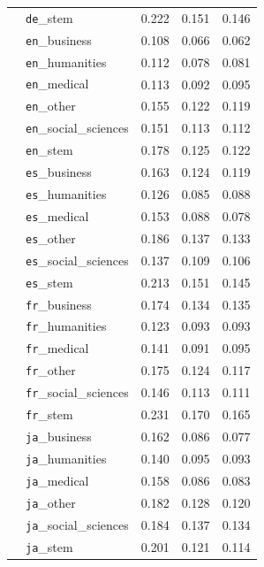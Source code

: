 \documentclass[11pt]{article}
\begin{document}
\begin{table}[t]
\begin{tabular}{llccc}
          & \texttt{de}\_stem            & 0.222 & 0.151 & 0.146 \\
          & \texttt{en}\_business        & 0.108 & 0.066 & 0.062 \\
          & \texttt{en}\_humanities      & 0.112 & 0.078 & 0.081 \\
          & \texttt{en}\_medical         & 0.113 & 0.092 & 0.095 \\
          & \texttt{en}\_other           & 0.155 & 0.122 & 0.119 \\
          & \texttt{en}\_social\_sciences & 0.151 & 0.113 & 0.112 \\
          & \texttt{en}\_stem            & 0.178 & 0.125 & 0.122 \\
          & \texttt{es}\_business        & 0.163 & 0.124 & 0.119 \\
          & \texttt{es}\_humanities      & 0.126 & 0.085 & 0.088 \\
          & \texttt{es}\_medical         & 0.153 & 0.088 & 0.078 \\
          & \texttt{es}\_other           & 0.186 & 0.137 & 0.133 \\
          & \texttt{es}\_social\_sciences & 0.137 & 0.109 & 0.106 \\
          & \texttt{es}\_stem            & 0.213 & 0.151 & 0.145 \\
          & \texttt{fr}\_business        & 0.174 & 0.134 & 0.135 \\
          & \texttt{fr}\_humanities      & 0.123 & 0.093 & 0.093 \\
          & \texttt{fr}\_medical         & 0.141 & 0.091 & 0.095 \\
          & \texttt{fr}\_other           & 0.175 & 0.124 & 0.117 \\
          & \texttt{fr}\_social\_sciences & 0.146 & 0.113 & 0.111 \\
          & \texttt{fr}\_stem            & 0.231 & 0.170 & 0.165 \\
          & \texttt{ja}\_business        & 0.162 & 0.086 & 0.077 \\
          & \texttt{ja}\_humanities      & 0.140 & 0.095 & 0.093 \\
          & \texttt{ja}\_medical         & 0.158 & 0.086 & 0.083 \\
          & \texttt{ja}\_other           & 0.182 & 0.128 & 0.120 \\
          & \texttt{ja}\_social\_sciences & 0.184 & 0.137 & 0.134 \\
          & \texttt{ja}\_stem            & 0.201 & 0.121 & 0.114 \\

\end{tabular}
\end{table}
\end{document}
